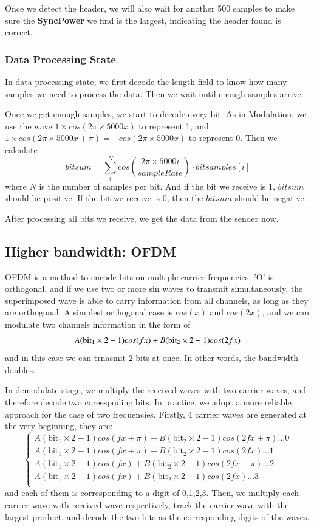 \documentclass[11pt, conference]{IEEEtran}
\begin{document}
    Once we detect the header, we will also wait for another 500 samples to make sure the \textbf{SyncPower} we find is the largest, indicating the header found is correct.
\subsubsection{Data Processing State}
    In data processing state, we first decode the length field to know how many samples we need to process the data.
    Then we wait until enough samples arrive.

    Once we get enough samples, we start to decode every bit. As in Modulation, we use the wave $1 \times cos(2\pi \times 5000 x)$ to represent 1, and
    $  1 \times cos(2\pi \times 5000 x + \pi) = -cos(2\pi \times 5000 x)$ to represent 0. Then we calculate 
    $$bitsum = \sum_{i}^{N}cos(\frac{2\pi \times 5000 i}{sampleRate}) \cdot bitsamples[i] $$
    where $N$ is the number of samples per bit. And if the bit we receive is 1, $bitsum$ should be positive. If the bit we receive is 0, then the $bitsum$
    should be negative.

    After processing all bits we receive, we get the data from the sender now.
\subsection{Higher bandwidth: OFDM}

OFDM is a method to encode bits on multiple carrier frequencies. 'O' is orthogonal, and if we use two or more sin waves to transmit simultaneously,
the superimposed wave is able to carry information from all channels, as long as they are orthogonal. A simplest orthogonal case is $cos(x)$ and $cos(2x)$,
and we can modulate two channels information in the form of 
\[
    A(\text{bit}_1 \times 2 - 1)cos(fx) + B(\text{bit}_2 \times 2 - 1)cos(2fx)\\
\]
and in this case we can trnasmit 2 bits at once. In other words, the bandwidth doubles. 

In demodulate stage, we multiply the received waves with two carrier waves, and therefore decode two coreespoding bits.
In practice, we adopt a more reliable approach for the case of two frequencies. Firstly, 4 carrier waves are generated at the
very beginning, they are:
\[
    \begin{cases}
    A(\text{bit}_1 \times 2 - 1)cos(fx+\pi) + B(\text{bit}_2 \times 2 - 1)cos(2fx + \pi) \dots 0 \\
    A(\text{bit}_1 \times 2 - 1)cos(fx+\pi) + B(\text{bit}_2 \times 2 - 1)cos(2fx) \dots 1\\
    A(\text{bit}_1 \times 2 - 1)cos(fx) + B(\text{bit}_2 \times 2 - 1)cos(2fx + \pi) \dots 2\\
    A(\text{bit}_1 \times 2 - 1)cos(fx) + B(\text{bit}_2 \times 2 - 1)cos(2fx) \dots 3\\
    \end{cases}
\]
and each of them is corresponding to a digit of 0,1,2,3. Then, we multiply each carrier wave with received wave respectively, track the carrier wave with the largest product, and decode the two
bits as the corresponding digits of the waves.
\end{document}
